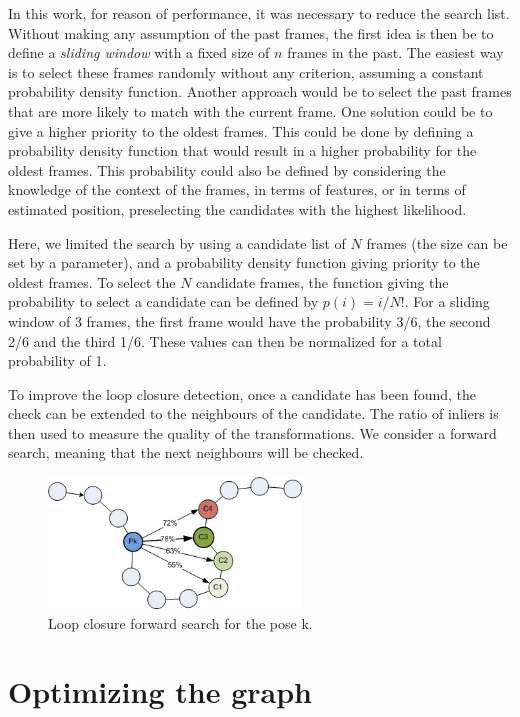 In this work, for reason of performance, it was necessary to reduce the search list. Without making any assumption of the past frames, the first idea is then be to define a \emph{sliding window} with a fixed size of $n$ frames in the past. The easiest way is to select these frames randomly without any criterion, assuming a constant probability density function. Another approach would be to select the past frames that are more likely to match with the current frame. One solution could be to give a higher priority to the oldest frames. This could be done by defining a probability density function that would result in a higher probability for the oldest frames. This probability could also be defined by considering the knowledge of the context of the frames, in terms of features, or in terms of estimated position, preselecting the candidates with the highest likelihood.

Here, we limited the search by using a candidate list of $N$ frames (the size can be set by a parameter), and a probability density function giving priority to the oldest frames. To select the $N$ candidate frames, the function giving the probability to select a candidate can be defined by $p(i) = i/N!$. For a sliding window of 3 frames, the first frame would have the probability 3/6, the second 2/6 and the third 1/6. These values can then be normalized for a total probability of 1.

To improve the loop closure detection, once a candidate has been found, the check can be extended to the neighbours of the candidate. The ratio of inliers is then used to measure the quality of the transformations. We consider a forward search, meaning that the next neighbours will be checked.

\begin{figure}[H]
\centering
 \includegraphics[width=0.6\textwidth]{figures/graph_lc_candidate}
\caption{Loop closure forward search for the pose k.}
\end{figure}

\section{Optimizing the graph}

